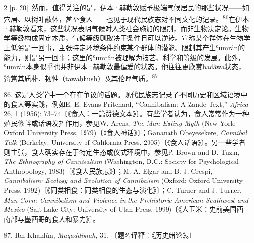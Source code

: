 \documentclass[10pt,a4paper]{article}
\begin{document}
\begin{paracol}{2}
{\scriptsize\color{gray} [p. 20]}\ 然而，值得关注的是，伊本·赫勒敦赋予极端气候居民的那些状况——如穴居、以树叶蔽体，甚至食人——也见于现代民族志对不同文化的记\mbox{录。\textsuperscript{86}}在伊本·赫勒敦看来，这些状况表明气候对人类社会施加的限制，而非生物决定论。生物学等级构成固定本质，气候等级则取决于条件且可以逆转。宣称某个群体在生物学上低劣是一回事，主张特定环境条件约束某个群体的潜能、限制其产生ʿumrân的能力，则是另一回事；这里的ʿumrân被理解为技艺、科学和等级的发展。此外，ʿumrân本身似乎也并非伊本·赫勒敦最偏爱的状态。他往往更欣赏badâwa状态，赞赏其质朴、韧性（tawaḥḥush）及其伦理气\mbox{质。\textsuperscript{87}}\par{\small 86. 这是人类学中一个存在争议的话题。现代民族志记录了不同历史和区域语境中的食人等实践，例如E. E. Evans-Pritchard, “Cannibalism: A Zande Text,” \textit{Africa} 26, 1 (1956): 73–74〔《食人：一篇赞德文本》〕。有些学者认为，食人常常作为一种殖民修辞或话语发挥作用，参见W. Arens, \textit{The Man-Eating Myth} (New York: Oxford University Press, 1979)〔《食人神话》〕；Gananath Obeyesekere, \textit{Cannibal Talk} (Berkeley: University of California Press, 2005)〔《食人话语》〕。另一些学者则主张，食人确实存在于特定生态或仪式环境中，参见P. Brown and D. Tuzin, \textit{The Ethnography of Cannibalism} (Washington, D.C.: Society for Psychological Anthropology, 1983)〔《食人民族志》〕；M. A. Elgar and B. J. Crespi, \textit{Cannibalism: Ecology and Evolution of Cannibalism} (Oxford: Oxford University Press, 1992)〔《同类相食：同类相食的生态与演化》〕；C. Turner and J. Turner, \textit{Man Corn: Cannibalism and Violence in the Prehistoric American Southwest and Mexico} (Salt Lake City: University of Utah Press, 1999)〔《人玉米：史前美国西南部与墨西哥的食人和暴力》〕。\par}{\small 87. Ibn Khaldûn, \textit{Muqaddimah}, 31. 〔题名译释：《历史绪论》。〕\par}
\switchcolumn

\end{paracol}
\end{document}
